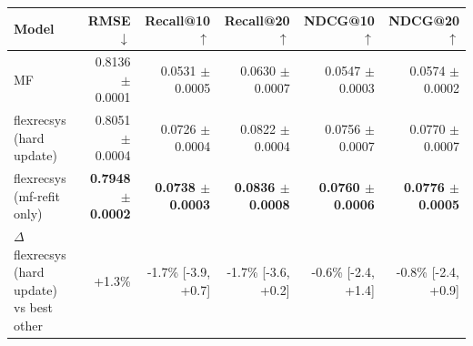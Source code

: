 \begin{tabular}{lrrrrr}
\toprule
Model & RMSE $\downarrow$ & Recall@10 $\uparrow$ & Recall@20 $\uparrow$ & NDCG@10 $\uparrow$ & NDCG@20 $\uparrow$ \\
\midrule
MF & 0.8136 $\pm$ 0.0001 & 0.0531 $\pm$ 0.0005 & 0.0630 $\pm$ 0.0007 & 0.0547 $\pm$ 0.0003 & 0.0574 $\pm$ 0.0002 \\
flexrecsys (hard update) & 0.8051 $\pm$ 0.0004 & 0.0726 $\pm$ 0.0004 & 0.0822 $\pm$ 0.0004 & 0.0756 $\pm$ 0.0007 & 0.0770 $\pm$ 0.0007 \\
flexrecsys (mf-refit only) & \textbf{0.7948 $\pm$ 0.0002} & \textbf{0.0738 $\pm$ 0.0003} & \textbf{0.0836 $\pm$ 0.0008} & \textbf{0.0760 $\pm$ 0.0006} & \textbf{0.0776 $\pm$ 0.0005} \\
\midrule
$\Delta$ flexrecsys (hard update) vs best other & +1.3\% & -1.7\% [-3.9, +0.7] & -1.7\% [-3.6, +0.2] & -0.6\% [-2.4, +1.4] & -0.8\% [-2.4, +0.9] \\
\bottomrule
\end{tabular}
